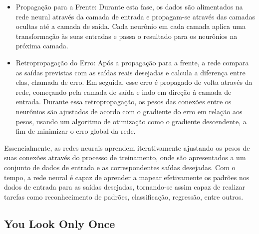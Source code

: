 \begin{itemize}
\item Propagação para a Frente: Durante esta fase, os dados são alimentados na rede neural através da camada de entrada e propagam-se através das camadas ocultas até a camada de saída. Cada neurônio em cada camada aplica uma transformação às suas entradas e passa o resultado para os neurônios na próxima camada.
\item Retropropagação do Erro: Após a propagação para a frente, a rede compara as saídas previstas com as saídas reais desejadas e calcula a diferença entre elas, chamada de erro. Em seguida, esse erro é propagado de volta através da rede, começando pela camada de saída e indo em direção à camada de entrada. Durante essa retropropagação, os pesos das conexões entre os neurônios são ajustados de acordo com o gradiente do erro em relação aos pesos, usando um algoritmo de otimização como o gradiente descendente, a fim de minimizar o erro global da rede.
\end{itemize}

Essencialmente, as redes neurais aprendem iterativamente ajustando os pesos de suas conexões através do processo de treinamento, onde são apresentados a um conjunto de dados de entrada e as correspondentes saídas desejadas. Com o tempo, a rede neural é capaz de aprender a mapear efetivamente os padrões nos dados de entrada para as saídas desejadas, tornando-se assim capaz de realizar tarefas como reconhecimento de padrões, classificação, regressão, entre outros.

\subsection{You Look Only Once}
\label{sec:yolo}

